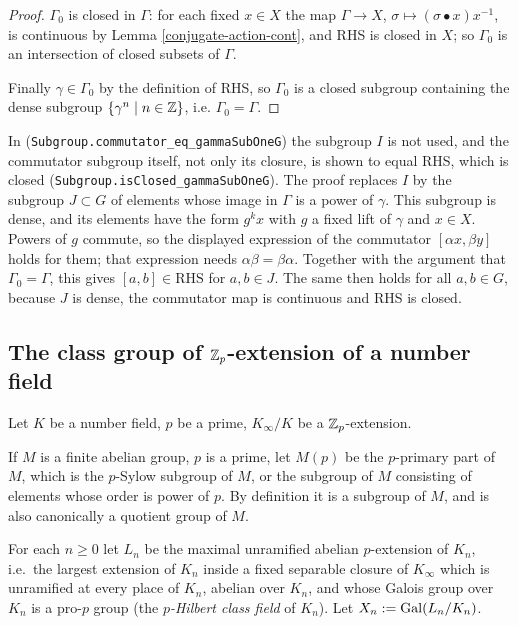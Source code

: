 \begin{proof}
$\Gamma_0$ is closed in $\Gamma$: for each fixed $x\in X$ the map
$\Gamma\to X$, $\sigma\mapsto(\sigma\bullet x)x^{-1}$, is continuous by
Lemma \ref{conjugate-action-cont}, and RHS is closed in $X$; so $\Gamma_0$ is an
intersection of closed subsets of $\Gamma$.

Finally $\gamma\in\Gamma_0$ by the definition of RHS, so $\Gamma_0$ is a closed
subgroup containing the dense subgroup $\{\gamma^n\mid n\in{\mathbb {Z}}\}$, i.e.
$\Gamma_0=\Gamma$.
\end{proof}

\begin{remark}
In {\Lean} (\texttt{Subgroup.commutator\_eq\_gammaSubOneG}) the subgroup $I$ is
not used, and the commutator subgroup itself, not only its closure, is shown to
equal RHS, which is closed (\texttt{Subgroup.isClosed\_gammaSubOneG}). The proof
replaces $I$ by the subgroup $J\subset G$ of elements whose image in $\Gamma$ is
a power of $\gamma$. This subgroup is dense, and its elements have the form
$g^kx$ with $g$ a fixed lift of $\gamma$ and $x\in X$. Powers of $g$ commute, so
the displayed expression of the commutator $[\alpha x,\beta y]$ holds for them;
that expression needs $\alpha\beta=\beta\alpha$. Together with the argument that
$\Gamma_0=\Gamma$, this gives $[a,b]\in\text{RHS}$ for $a,b\in J$. The same then
holds for all $a,b\in G$, because $J$ is dense, the commutator map is continuous
and RHS is closed.
\end{remark}

\subsection{The class group of ${\mathbb {Z}}_p$-extension of a number field}

Let $K$ be a number field, $p$ be a prime,
$K_\infty/K$ be a ${\mathbb {Z}}_p$-extension.

\begin{definition}
\label{p-primary-part}
\leanok
If $M$ is a finite abelian group, $p$ is a prime, let $M(p)$ be the $p$-primary
part of $M$, which is the $p$-Sylow subgroup of $M$, or the subgroup of $M$
consisting of elements whose order is power of $p$.
By definition it is a subgroup of $M$, and is also canonically a quotient group of $M$.
\end{definition}

\begin{definition}
\label{Zp-ext-Ln}
\leanok
For each $n\geq 0$ let $L_n$ be the
maximal unramified abelian $p$-extension of $K_n$,
i.e.~the largest extension of $K_n$ inside a fixed separable closure of
$K_\infty$ which is unramified at every place of $K_n$, abelian over $K_n$,
and whose Galois group over $K_n$ is a pro-$p$ group
(the \emph{$p$-Hilbert class field} of $K_n$).
Let $X_n:={\mathrm{Gal}}(L_n/K_n)$.
\end{definition}

